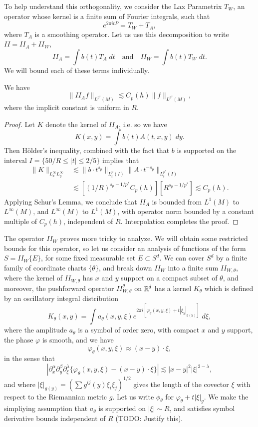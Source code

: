 To help understand this orthogonality, we consider the Lax Parametrix $T_W$, an operator whose kernel is a finite sum of Fourier integrals, such that
%
\[ e^{2 \pi i t P} = T_W + T_A, \]
%
where $T_A$ is a smoothing operator. Let us use this decomposition to write $II = II_A + II_W$,
%
\[ II_A = \int b(t) T_A\; dt \quad\text{and}\quad II_W = \int b(t) T_W\; dt. \]
%
We will bound each of these terms individually.

\begin{lemma}
    We have
    \[ \| II_A f \|_{L^{p^*}(M)} \lesssim C_p(h) \| f \|_{L^{p^*}(M)}, \]
    where the implicit constant is uniform in $R$.
\end{lemma}
\begin{proof}
    Let $K$ denote the kernel of $II_A$, i.e. so we have
    \[ K(x,y) = \int b(t) A(t,x,y)\; dy. \]
    Then H\"{o}lder's inequality, combined with the fact that $b$ is supported on the interval $I = \{ 50/R \leq |t| \leq 2/5 \}$ implies that
    \begin{align*}
        \| K \|_{L^\infty_x L^\infty_y} &\lesssim \| b \cdot t^{s_p} \|_{L^p_t(I)} \| A \cdot t^{-s_p} \|_{L^{p^*}_t(I)}\\
        &\lesssim \left[ (1/R)^{s_p - 1/p^*} C_p(h) \right] \left[ R^{s_p - 1/p^*} \right] \lesssim C_p(h).
    \end{align*}
    Applying Schur's Lemma, we conclude that $II_A$ is bounded from $L^1(M)$ to $L^\infty(M)$, and $L^\infty(M)$ to $L^1(M)$, with operator norm bounded by a constant multiple of $C_p(h)$, independent of $R$. Interpolation completes the proof.
\end{proof}




The operator $II_W$ proves more tricky to analyze. We will obtain some restricted bounds for this operator, so let us consider an analysis of functions of the form $S = II_W \{ E \}$, for some fixed measurable set $E \subset S^d$. We can cover $S^d$ by a finite family of coordinate charts $\{ \theta \}$, and break down $II_W$ into a finite sum $II_{W,\theta}$, where the kernel of $II_{W,\theta}$ has $x$ and $y$ support on a compact subset of $\theta$, and moreover, the pushforward operator $II_{W,\theta}^\theta$ on $\operatorname{\mathbb{R}}^d$ has a kernel $K_\theta$ which is defined by an oscillatory integral distribution
%
\[ K_\theta(x,y) = \int a_\theta(x,y,\xi) e^{2 \pi i [ \varphi_\theta(x,y,\xi) + t |\xi_y|_{g(y)} ]}\; d\xi, \]
%
where the amplitude $a_\theta$ is a symbol of order zero, with compact $x$ and $y$ support, the phase $\varphi$ is smooth, and we have
%
\[ \varphi_\theta(x,y,\xi) \approx (x - y) \cdot \xi, \]
%
in the sense that
%
\[ |\partial_x^\alpha \partial_y^\beta \partial_\xi^\lambda \{ \varphi_\theta(x,y,\xi) - (x - y) \cdot \xi \}| \lesssim |x - y|^2 |\xi|^{2 - \lambda}, \]
%
and where $|\xi|_{g(y)} = (\sum g^{ij}(y) \xi_i \xi_j )^{1/2}$ gives the length of the covector $\xi$ with respect to the Riemannian metric $g$. Let us write $\phi_\theta$ for $\varphi_\theta + t |\xi|_g$. We make the simpliying assumption that $a_\theta$ is supported on $|\xi| \sim R$, and satisfies symbol derivative bounds independent of $R$ (TODO: Justify this).

